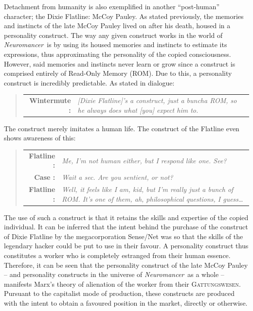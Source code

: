 \documentclass[11pt]{article}
\newcommand\neuro{\textit{Neuromancer}}
\begin{document}
	\smallbreak\noindent
	Detachment from humanity is also exemplified in another ``post-human'' character; the Dixie Flatline: McCoy Pauley. As stated previously, the memories and instincts of the late McCoy Pauley lived on after his death, housed in a personality construct. The way any given construct works in the world of \neuro\ is by using its housed memories and instincts to estimate its expressions, thus approximating the personality of the copied consciousness. However, said memories and instincts never learn or grow since a construct is comprised entirely of Read-Only Memory (ROM). Due to this, a personality construct is incredibly predictable. As stated in dialogue:
	\begin{quote}
		\begin{tabular}{>{\bf}r<{:}>{\it}p{10cm}}
			Wintermute & [Dixie Flatline]'s a construct, just a buncha ROM, so he always does what [you] expect him to.\\
		\end{tabular}
		\flushright{--\neuro: p. 226}
	\end{quote}
	The construct merely imitates a human life. The construct of the Flatline even shows awareness of this:
	\begin{quote}
		\begin{tabular}{>{\bf}r<{:}>{\it}p{10cm}}
			Flatline & Me, I’m not human either, but I respond like one. See?\\
			Case & Wait a sec. Are you sentient, or not?\\
			Flatline & Well, it \emph{feels} like I am, kid, but I'm really just a bunch of ROM. It's one of them, ah, philosophical questions, I guess…\\
		\end{tabular}
		\flushright{--\neuro: p. 145}
	\end{quote}
	The use of such a construct is that it retains the skills and expertise of the copied individual. It can be inferred that the intent behind the purchase of the construct of Dixie Flatline by the megacorporation Sense/Net was so that the skills of the legendary hacker could be put to use in their favour. A personality construct thus constitutes a worker who is completely estranged from their human essence. Therefore, it can be seen that the personality construct of the late McCoy Pauley – and personality constructs in the universe of \neuro\ as a whole – manifests Marx’s theory of alienation of the worker from their \textsc{Gattungswesen}. Pursuant to the capitalist mode of production, these constructs are produced with the intent to obtain a favoured position in the market, directly or otherwise.
	
\end{document}
